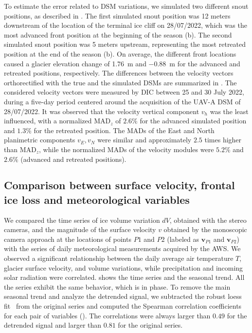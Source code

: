 To estimate the error related to DSM variations, we simulated two different snout positions, as described in .
The first simulated snout position was 12 meters downstream of the location of the terminal ice cliff on 28/07/2022, which was the most
advanced front position at the beginning of the season (b).
The second simulated snout position was 5 meters upstream, representing the most retreated position at the end of the season (b).
On average, the different front locations caused a glacier elevation change of \SI{+1.76}{\meter} and \SI{-0.88}{\meter} for the advanced and retreated positions, respectively.
The differences between the velocity vectors orthorectified with the true and the simulated DSMs are summarized in .
The considered velocity vectors were measured by DIC between 25 and 30 July 2022, during a five-day period centered around the acquisition of the UAV-A DSM of 28/07/2022.
It was observed that the velocity vertical component \(v_h\) was the least influenced, with a normalized MAD\(_z\) of \(2.6\%\) for the advanced simulated position and \(1.3\%\) for the retreated position. 
The MADs of the East and North planimetric components \(v_E, v_N\) were similar and approximately \(2.5\) times higher than MAD\(_z\), while the normalized MADs of the velocity modules were \(5.2\%\) and \(2.6\%\) (advanced and retreated positions).

\subsection{Comparison between surface velocity, frontal ice loss and meteorological
  variables}\label{sec:4:res_temp_comparison}

We compared the time series of ice volume variation \(dV\), obtained with the stereo cameras, and the magnitude of the surface velocity \(v\) obtained by the monoscopic camera approach at the locations of points \(P1\) and \(P2\) (labeled as \(\mathbf{v}_{P1}\) and \(\mathbf{v}_{P2}\)) with the series of daily meteorological measurements acquired by the AWS.
We observed a significant relationship between the daily average air temperature \(T\), glacier surface velocity, and volume variations, while precipitation and incoming solar radiation were correlated. 
 shows the time series and the seasonal trend.
All the series exhibit the same behavior, which is in phase.
To remove the main seasonal trend and analyze the detrended signal, we subtracted the robust loess fit~\citep{Cleveland1979} from the original series and computed the Spearman correlation coefficients for each pair of variables ().
The correlations were always larger than \(0.49\) for the detrended signal and larger than \(0.81\) for the original series.

